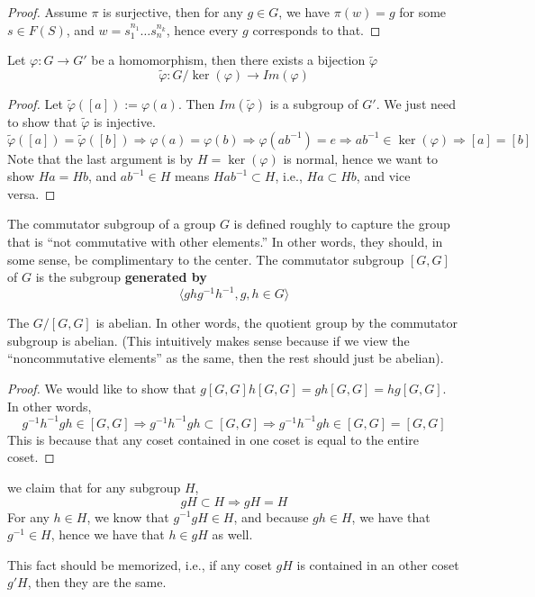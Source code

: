 \begin{proof}
    Assume $\pi$ is surjective, then for any $g\in G$, we have $\pi(w)=g$ for some $s\in F(S)$, and $w=s_1^{n_1}\ldots s_n^{n_k}$, hence every $g$ corresponds to that.
\end{proof}
\begin{thm}
    Let $\varphi: G\to G'$ be a homomorphism, then there exists a bijection $\tilde{\varphi}$
    \begin{equation*}
        \tilde{\varphi}: G/\ker(\varphi)\to Im(\varphi)
    \end{equation*}
\end{thm}
\begin{proof}
    Let $\tilde{\varphi}([a]):=\varphi(a)$. Then $Im(\tilde{\varphi})$ is a subgroup of $G'$. We just need to show that $\tilde{\varphi}$ is injective. 
    \begin{equation*}
        \tilde{\varphi}([a])=\tilde{\varphi}([b])\Rightarrow \varphi(a)=\varphi(b)\Rightarrow \varphi(ab^{-1})=e\Rightarrow ab^{-1}\in\ker(\varphi)\Rightarrow [a]=[b]
    \end{equation*}
    Note that the last argument is by $H=\ker(\varphi)$ is normal, hence we want to show $Ha=Hb$, and $ab^{-1}\in H$ means $Hab^{-1}\subset H$, i.e., $Ha\subset Hb$, and vice versa.
\end{proof}
\begin{example}
    The commutator subgroup of a group $G$ is defined roughly to capture the group that is ``not commutative with other elements.'' In other words, they should, in some sense, be complimentary to the center. The commutator subgroup $[G,G]$ of $G$ is the subgroup \textbf{generated by}
    \begin{equation*}
        \langle ghg^{-1}h^{-1}, g,h\in G\rangle 
    \end{equation*}
    \begin{prop}
        The $G/[G,G]$ is abelian. In other words, the quotient group by the commutator subgroup is abelian. (This intuitively makes sense because if we view the ``noncommutative elements'' as the same, then the rest should just be abelian).
    \end{prop}
    \begin{proof}
        We would like to show that $g[G,G]h[G,G]=gh[G,G]=hg[G,G]$. In other words,
        \begin{equation*}
            g^{-1}h^{-1}gh\in [G,G]\Rightarrow g^{-1}h^{-1}gh\subset [G,G]\Rightarrow g^{-1}h^{-1}gh\in [G,G]=[G,G]
        \end{equation*}
        This is because that any coset contained in one coset is equal to the entire coset.
    \end{proof}
    \begin{lem}
        we claim that for any subgroup $H$,
        \begin{equation*}
            gH\subset H\Rightarrow gH=H
        \end{equation*}
        For any $h\in H$, we know that $g^{-1}gH\in H$, and because $gh\in H$, we have that $g^{-1}\in H$, hence we have that $h\in gH$ as well.
    \end{lem}
\end{example}
\begin{warn}
    This fact should be memorized, i.e., if any coset $gH$ is contained in an other coset $g'H$, then they are the same.
\end{warn}

